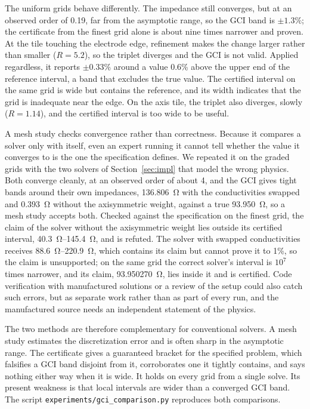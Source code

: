 \documentclass[11pt]{article}
\begin{document}
The uniform grids behave differently. The impedance still converges, but at
an observed order of 0.19, far from the asymptotic range, so the GCI band is
$\pm1.3\%$; the certificate from the finest grid alone is about nine times
narrower and proven. At the tile touching the electrode edge, refinement makes
the change larger rather than smaller ($R=5.2$), so the triplet diverges and the
GCI is not valid. Applied regardless, it reports $\pm0.33\%$ around a value
0.6\% above the upper end of the reference interval, a band that excludes the
true value. The certified
interval on the same grid is wide but contains the reference, and its width
indicates that the grid is inadequate near the edge. On the axis
tile, the triplet also diverges, slowly ($R=1.14$), and the certified interval
is too wide to be useful.

A mesh study checks convergence rather than correctness. Because it compares a
solver only with itself, even an expert running it cannot tell whether the value it
converges to is the one the specification defines. We repeated it on the graded
grids with the two solvers of Section~\ref{sec:impl} that model the wrong
physics. Both converge cleanly, at an observed order of about 4, and the GCI
gives tight bands around their own impedances, \SI{136.806}{\ohm} with the
conductivities swapped and \SI{0.393}{\ohm} without the axisymmetric weight,
against a true \SI{93.950}{\ohm}, so a mesh study accepts both. Checked against
the specification on the finest grid, the claim of the solver without the axisymmetric weight lies outside
its certified interval, \SIrange{40.3}{145.4}{\ohm}, and is refuted. The solver with swapped conductivities
receives \SIrange{88.6}{220.9}{\ohm}, which contains its claim but cannot prove
it to 1\%, so the claim is unsupported; on the
same grid the correct solver's interval is $10^{7}$ times narrower, and its claim,
\SI{93.950270}{\ohm}, lies inside it and is certified. Code
verification with manufactured solutions or a review of the setup could also catch
such errors, but as separate work rather than as part of every run, and the manufactured source needs an independent statement of the physics.

The two methods are therefore complementary for conventional solvers. A mesh
study estimates the discretization error and is often sharp in the asymptotic
range. The certificate gives a guaranteed bracket for the specified problem,
which falsifies a GCI band disjoint from it, corroborates one it tightly
contains, and says nothing either way when it is wide. It holds on every grid
from a single solve. Its present weakness is that local intervals are wider
than a converged GCI band. The script \texttt{experiments/gci\_comparison.py} reproduces both comparisons.
\end{document}
